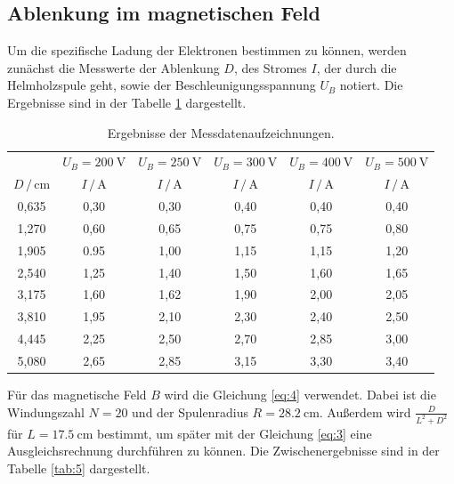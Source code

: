 \subsection{Ablenkung im magnetischen Feld}
Um die spezifische Ladung der Elektronen bestimmen zu können, werden zunächst
die Messwerte der Ablenkung $D$, des Stromes $I$, der durch die Helmholzspule geht, sowie der
Beschleunigungsspannung $U_B$ notiert.
Die Ergebnisse sind in der Tabelle \ref{tab:4} dargestellt.
\begin{table}[H]
  \centering
  \caption{Ergebnisse der Messdatenaufzeichnungen.}
  \label{tab:4}
  \begin{tabular}{c c c c c c}
\toprule
& \multicolumn{1}{c}{$U_B=\SI{200}{\volt}$} & \multicolumn{1}{c}{$U_B=\SI{250}{\volt}$} &\multicolumn{1}{c}{$U_B=\SI{300}{\volt}$}&\multicolumn{1}{c}{$U_B=\SI{400}{\volt}$}&\multicolumn{1}{c}{$U_B=\SI{500}{\volt}$}\\
\cmidrule(lr){2-2}\cmidrule(lr){3-3}\cmidrule(lr){4-4}\cmidrule(lr){5-5}\cmidrule(lr){6-6}
$D \, / \, \si{\centi\meter}$ & $I \, / \, \si{\ampere}$ & $I \, / \, \si{\ampere}$ & $I \, / \, \si{\ampere}$ &$I \, / \, \si{\ampere}$ & $I \, / \, \si{\ampere}$\\
\midrule
0,635 & 0,30  & 0,30 & 0,40 & 0,40& 0,40\\
1,270 & 0,60  & 0,65 & 0,75 & 0,75& 0,80\\
1,905 & 0.95  & 1,00 & 1,15 & 1,15& 1,20\\
2,540 & 1,25  & 1,40 & 1,50 & 1,60& 1,65\\
3,175 & 1,60  & 1,62 & 1,90 & 2,00& 2,05\\
3,810 & 1,95  & 2,10 & 2,30 & 2,40& 2,50\\
4,445 & 2,25  & 2,50 & 2,70 & 2,85& 3,00\\
5,080 & 2,65  & 2,85 & 3,15 & 3,30& 3,40\\
\bottomrule
  \end{tabular}
\end{table}
Für das magnetische Feld $B$ wird die Gleichung \ref{eq:4} verwendet. Dabei ist die
Windungszahl $N = 20 $ und der Spulenradius $R = \SI{28.2}{\centi\meter}$.
Außerdem wird $\frac{D}{L^2+D^2}$ für $L = \SI{17.5}{\centi\meter}$ bestimmt, um später
mit der Gleichung \ref{eq:3} eine Ausgleichsrechnung durchführen zu können.
Die Zwischenergebnisse sind in der Tabelle \ref{tab:5} dargestellt.
